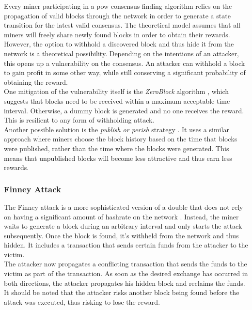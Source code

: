 \documentclass[12pt,a4paper]{article}
\begin{document}
Every miner participating in a \gls{pow} consensus finding algorithm relies on the propagation of valid blocks through the network in order to generate a state transition for the latest valid \gls{consensus}. The theoretical model assumes that all miners will freely share newly found blocks in order to obtain their \glspl{reward}.\\

However, the option to withhold a discovered block and thus hide it from the network is a theoretical possibility. Depending on the intentions of an attacker, this opens up a vulnerability on the \gls{consensus}. An attacker can withhold a block to gain profit in some other way, while still conserving a significant probability of obtaining the \gls{reward}.\\

One mitigation of the vulnerability itself is the \textit{ZeroBlock} algorithm \cite{zeroblock}, which suggests that blocks need to be received within a maximum acceptable time interval. Otherwise, a dummy block is generated and no one receives the reward. This is resilient to any form of withholding attack.\\

Another possible solution is the \textit{publish or perish} strategy \cite{perish}. It uses a similar approach where miners choose the block history based on the time that \glspl{block} were published, rather than the time where the \glspl{block} were generated. This means that unpublished \glspl{block} will become less attractive and thus earn less \glspl{reward}.\\

\subsubsection{Finney Attack}

The Finney attack is a more sophisticated version of a \gls{double} that does not rely on having a significant amount of \gls{hashrate} on the network \cite{survey}. Instead, the miner waits to generate a block during an arbitrary interval and only starts the attack subsequently. Once the block is found, it's withheld from the network and thus hidden. It includes a \gls{transaction} that sends certain funds from the attacker to the victim.\\

The attacker now propagates a conflicting \gls{transaction} that sends the funds to the victim as part of the \gls{transaction}. As soon as the desired exchange has occurred in both directions, the attacker propagates his hidden block and reclaims the funds. It should be noted that the attacker risks another block being found before the attack was executed, thus risking to lose the \gls{reward}.\\
\end{document}
